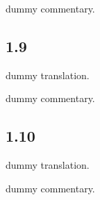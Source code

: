 \begin{ekdosis}
  \begin{philcomm}[hp01_008]          
    dummy commentary.
  \end{philcomm}

  \subsection*{1.9}
  \begin{translation}[hp01_009]
    dummy translation.
  \end{translation}
  
  \begin{philcomm}[hp01_009]          
    dummy commentary.
  \end{philcomm}

  \subsection*{1.10}
  \begin{translation}[hp01_010]
    dummy translation.
  \end{translation}
  
  \begin{philcomm}[hp01_010]          
    dummy commentary.
  \end{philcomm}

\end{ekdosis}


